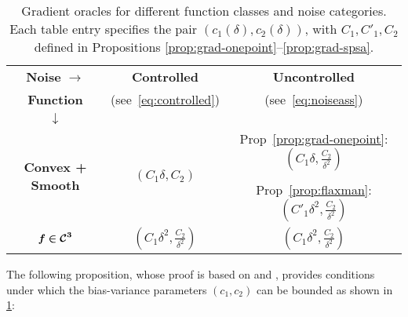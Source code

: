 \begin{table}
\small
\centering
\begin{tabular}{|c|c|c|}
\toprule
\textbf{Noise }$\bm{ \rightarrow}$ & \textbf{Controlled } & \textbf{Uncontrolled } \\
\textbf{Function } &(see~\eqref{eq:controlled})&(see~\eqref{eq:noiseass})\\
$\bm{\downarrow}$ &&\\\midrule
\multirow{3}{*}{\textbf{Convex + Smooth}} & \multirow{3}{*}{$(C_1 \delta, C_2)$} & %
{Prop~\ref{prop:grad-onepoint}: $(C_1\delta, \frac{C_2}{\delta^2}) $}\\
&& \\
 &&{Prop~\ref{prop:flaxman}: $(C'_1\delta^2, \frac{C_2}{\delta^2}) $}\\\midrule
\multirow{2}{*}{$\bm{f \in \mathcal{C}^3}$} & \multirow{2}{*}{$(C_1 \delta^2, \frac{C_2}{\delta^2})$} & \multirow{2}{*}{$(C_1 \delta^2, \frac{C_2}{\delta^2})$} \\
 &&\\\bottomrule
\end{tabular}
\caption{Gradient oracles for different function classes and noise categories. Each table entry specifies the pair $(c_1(\delta), c_2(\delta))$, with $C_1, C'_1, C_2$ defined in Propositions \ref{prop:grad-onepoint}--\ref{prop:grad-spsa}.
\label{tab:oracles}
}
\end{table}
The following proposition, whose proof is based on \citep[Lemma~1]{spall1992multivariate} and \citep[Lemma~1]{duchi2015optimal}, provides conditions under which the bias-variance parameters $(c_1,c_2)$ can be bounded as shown in \cref{tab:oracles}:
